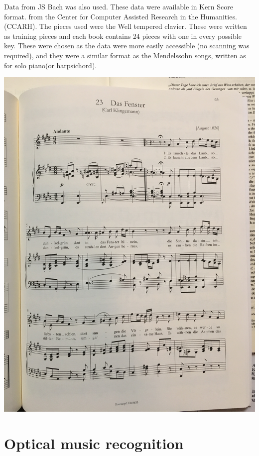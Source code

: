 \documentclass[12pt,twoside]{reedthesis}
\theoremstyle{definition}
\theoremstyle{definition}
\theoremstyle{definition}
\theoremstyle{remark}
\begin{document}
Data from JS Bach was also used. These data were available in Kern Score
format. from the Center for Computer Assisted Research in the
Humanities. (CCARH). The pieces used were the Well tempered clavier.
These were written as training pieces and each book contains 24 pieces
with one in every possible key. These were chosen as the data were more
easily accessible (no scanning was required), and they were a similar
format as the Mendelssohn songs, written as for solo piano(or
harpsichord).
\begin{Shaded}
\begin{Highlighting}[]
\OperatorTok{::}\NormalTok{(}\NormalTok{)}
\end{Highlighting}
\end{Shaded}
\includegraphics{images/scorephoto.JPG}

\section{Optical music recognition}\label{optical-music-recognition}
\end{document}
